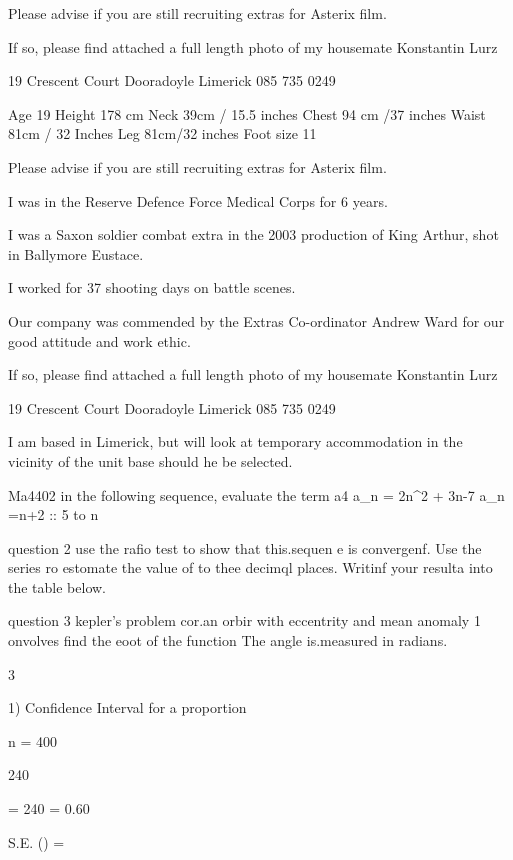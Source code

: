 Please advise if you are still recruiting extras for Asterix film.

If so, please find attached a full length photo of my housemate Konstantin Lurz

19 Crescent Court
Dooradoyle 
Limerick
085 735 0249

Age 19
Height 178 cm
Neck 39cm / 15.5 inches
Chest 94 cm /37 inches
Waist 81cm / 32 Inches
Leg 81cm/32 inches
Foot size 11



Please advise if you are still recruiting extras for Asterix film.

I was in the Reserve Defence Force Medical Corps for 6 years.

I was a Saxon soldier combat extra in the 2003 production of King Arthur, shot in Ballymore Eustace.

I worked for 37 shooting days on battle scenes.

Our company was commended by the Extras Co-ordinator Andrew Ward for our good attitude and work ethic. 








If so, please find attached a full length photo of my housemate Konstantin Lurz

19 Crescent Court
Dooradoyle 
Limerick
085 735 0249

I am based in Limerick, but will look at temporary accommodation  in the vicinity of the unit base should he be selected.




Ma4402
 in the following sequence, evaluate the  term a4
a_n = 2n^2 + 3n-7
a_n =n+2 
:: 5 to n 

question 2
use the rafio test to show that this.sequen e is convergenf.
Use the series ro estomate the value of to thee decimql places.
Writinf your resulta into the table below.

question 3
kepler's problem cor.an orbir with eccentrity and mean anomaly 1 onvolves find the eoot of the function 
The angle is.measured in radians.


3

1) Confidence Interval for a proportion
 
n = 400
 
240 
 
 
 = {240 } = 0.60
 
 
S.E. \;() = 
 

